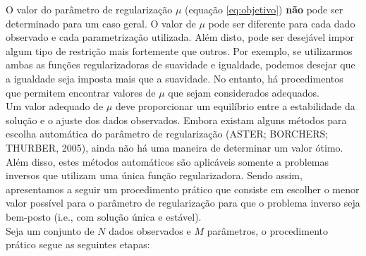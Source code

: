 O valor do parâmetro de regularização $\mu$ (equação \ref{eq:objetivo}) {\bf não}
pode ser determinado para um caso geral.
O valor de $\mu$ pode ser diferente para cada dado observado e cada parametrização
utilizada.
Além disto, pode ser desejável impor algum tipo de restrição mais fortemente
que outros. Por exemplo, se utilizarmos ambas as funções regularizadoras de
suavidade e igualdade, podemos desejar que a igualdade seja imposta mais que a
suavidade. No entanto, há procedimentos que permitem encontrar valores de $\mu$
que sejam considerados adequados. 
\\
\indent Um valor adequado de $\mu$ deve proporcionar um equilíbrio entre
a estabilidade da solução e o ajuste dos dados observados.
Embora existam alguns métodos para escolha automática do parâmetro de regularização
(ASTER; BORCHERS; THURBER, 2005), ainda não há uma maneira de determinar um valor ótimo.
Além disso, estes métodos automáticos são aplicáveis somente a problemas inversos
que utilizam uma única função regularizadora.
Sendo assim, apresentamos a seguir um procedimento prático que consiste em escolher o
menor valor possível para o parâmetro de regularização para que o problema
inverso seja bem-posto (i.e., com solução única e estável).
\\
\indent Seja um conjunto de $N$ dados observados e $M$ parâmetros,
o procedimento prático segue as seguintes etapas:

